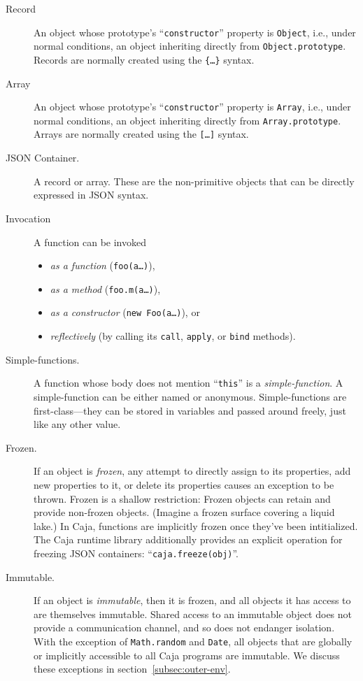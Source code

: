 \documentclass[letterpaper,twocolumn,10pt]{article}
\newcommand{\code}[1]{{\tt {#1}}}              %
\begin{document}
\begin{description}

  \item[Record] An object whose prototype's ``\code{constructor}'' property is \code{Object}, i.e., under normal 
  conditions, an object inheriting directly from \code{Object.prototype}. Records are normally created using the 
  \code{\{\ldots\}} syntax.

  \item[Array] An object whose prototype's ``\code{constructor}'' property is \code{Array}, i.e., under normal 
  conditions, an object inheriting directly from \code{Array.prototype}. Arrays are normally created using the 
  \code{[\ldots]} syntax.

  \item[JSON Container.] A record or array. These are the non-primitive objects that can be directly expressed in 
  JSON syntax.
  
  \item[Invocation] A function can be invoked
  \begin{itemize}
    \item \emph{as a function} (\code{foo(a\ldots)}),
    \item \emph{as a method} (\code{foo.m(a\ldots)}),
    \item \emph{as a constructor} (\code{new Foo(a\ldots)}), or
    \item \emph{reflectively} (by calling its \code{call}, \code{apply}, or \code{bind} methods).
  \end{itemize}

  \item[Simple-functions.] A function whose body does not mention ``\code{this}'' is a \emph{simple-function}. A 
  simple-function can be either named or anonymous. Simple-functions are first-class---they can be stored in 
  variables and passed around freely, just like any other value.
  
  \item[Frozen.] If an object is \emph{frozen}, any attempt to directly assign to its properties, add new properties 
  to it, or delete its properties causes an exception to be thrown. Frozen is a shallow restriction: Frozen objects 
  can retain and provide non-frozen objects. (Imagine a frozen surface covering a liquid lake.) In Caja, functions  
  are implicitly frozen once they've been intitialized. The Caja runtime library additionally provides an explicit 
  operation for freezing JSON containers: ``\code{caja.freeze(obj)}''.
  
  \item[Immutable.] If an object is \emph{immutable}, then it is frozen, and all objects it has access to are 
  themselves immutable. Shared access to an immutable object does not provide a communication channel, and so does 
  not endanger isolation. With the exception of \code{Math.random} and \code{Date}, all objects that are globally or 
  implicitly accessible to all Caja programs are immutable. We discuss these exceptions in 
  section~\ref{subsec:outer-env}.

\end{description}
\end{document}
